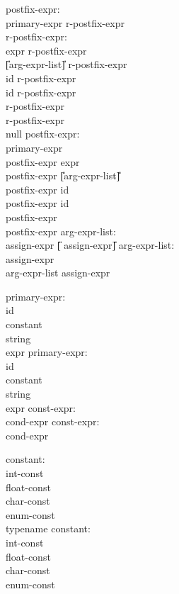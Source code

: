 \begin{center}
\PAIR
{
postfix-expr:\\
\>	primary-expr r-postfix-expr\\
r-postfix-expr:\\
\>	\T{\U{[}} expr \T{\U{]}}  r-postfix-expr\\
\>	\T{(} \U{[}arg-expr-list\U{]} \T{)}  r-postfix-expr\\
\>	 id  r-postfix-expr\\
\>	\T{-$>$} id r-postfix-expr\\
\>	\T{++}  r-postfix-expr\\
\>	\T{--}  r-postfix-expr\\
\>	null
}
{
postfix-expr:\\
\>	primary-expr\\
\>	postfix-expr \T{\U{[}} expr \T{\U{]}}\\
\>	postfix-expr \T{(} \U{[}arg-expr-list\U{]} \T{)}\\
\>	postfix-expr  id\\
\>	postfix-expr \T{-$>$} id\\
\>	postfix-expr \T{++}\\
\>	postfix-expr \T{--}
}
\PAIR
{
arg-expr-list:\\
\>	assign-expr \U{[}\T{,} assign-expr\U{]}
}
{
arg-expr-list:\\
\>	assign-expr\\
\>	arg-expr-list \T{,} assign-expr
}

\PAIR
{
primary-expr:\\
\>	id\\
\>	constant\\
\>	string\\
\>	\T{(} expr \T{)}
}
{
primary-expr:\\
\>	id\\
\>	constant\\
\>	string\\
\>	\T{(}expr \T{)}
}
\PAIR
{
const-expr:\\
\>	cond-expr
}
{
const-expr:\\
\>	cond-expr
}

\PAIR
{
constant:\\
\>	int-const\\
\>	float-const\\
\>	char-const\\
\>	enum-const\\
\>	typename
}
{
constant:\\
\>	int-const\\
\>	float-const\\
\>	char-const\\
\>	enum-const
}


\end{center}
  